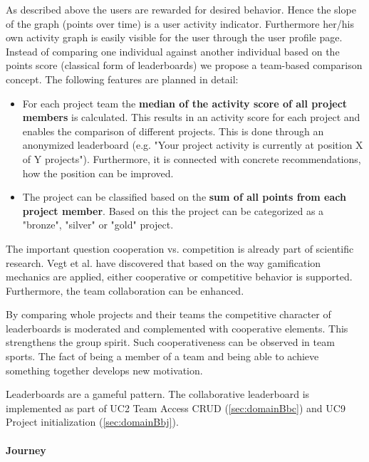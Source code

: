 As described above the users are rewarded for desired behavior. Hence the slope of the graph (points over time) is a user activity indicator. Furthermore her/his own activity graph is easily visible for the user through the user profile page.
Instead of comparing one individual against another individual based on the points score (classical form of leaderboards) we propose a team-based comparison concept. 
The following features are planned in detail:
\begin{itemize}
	\item For each project team the \textbf{median of the activity score of all project members} is calculated. This results in an activity score for each project and enables the comparison of different projects. This is done through an anonymized leaderboard (e.g. "Your project activity is currently at position X of Y projects"). Furthermore, it is connected with concrete recommendations, how the position can be improved.
	\item The project can be classified based on the \textbf{sum of all points from each project member}. Based on this the project can be categorized as a "bronze", "silver" or "gold" project.
\end{itemize}

The important question cooperation vs. competition is already part of scientific research. Vegt et al. \cite{vegtDesigningGamificationGuide2015} have discovered that based on the way gamification mechanics are applied, either cooperative or competitive behavior is supported. Furthermore, the team collaboration can be enhanced.

By comparing whole projects and their teams the competitive character of leaderboards is moderated and complemented with cooperative elements. This strengthens the group spirit. Such cooperativeness can be observed in team sports. The fact of being a member of a team and being able to achieve something together develops new motivation.

Leaderboards are a gameful pattern. 
The collaborative leaderboard is implemented as part of \ac{UC}2 Team Access CRUD (\ref{sec:domainBbc}) and \ac{UC}9 Project initialization (\ref{sec:domainBbj}).

\paragraph*{Journey}

